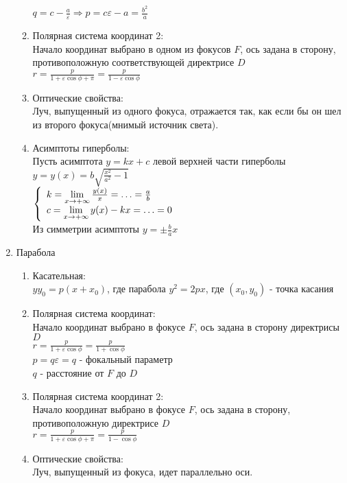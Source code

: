 \documentclass[12pt]{article}
\begin{document}
\begin{enumerate}
\begin{enumerate}
        $q = c - \frac a\varepsilon \Rightarrow p=c\varepsilon - a = \frac{b^2}a$
        \item Полярная система координат 2:\\
        Начало координат выбрано в одном из фокусов $F$, ось задана в сторону, противоположную соответствующей директрисе $D$\\
        $r=\frac{p}{1+\varepsilon\cos\phi+\pi} = \frac{p}{1-\varepsilon\cos\phi}$
        \item Оптические свойства:\\
        Луч, выпущенный из одного фокуса, отражается так, как если бы он шел из второго фокуса(мнимый источник света).
        \item Асимптоты гиперболы:\\
        Пусть асимптота $y=kx+c$ левой верхней части гиперболы $y=y(x)=b\sqrt{\frac{x^2}{a^2}-1}$ \\
        $\left\{\begin{array}{l}
             k = \lim\limits_{x\rightarrow +\infty} \frac{y(x)}x = \ldots = \frac ab \\
             c = \lim\limits_{x\rightarrow +\infty} y(x)-kx = \ldots = 0
        \end{array}\right.$\\
        Из симметрии асимптоты $y=\pm\frac bax$
    \end{enumerate}
    \item Парабола
    \begin{enumerate}
        \item Касательная:\\
        $yy_0=p(x+x_0)$, где парабола  $y^2=2px$, где $(x_0, y_0)$ - точка касания
        \item Полярная система координат:\\
        Начало координат выбрано в фокусе $F$, ось задана в сторону директрисы $D$\\
        $r=\frac{p}{1+\varepsilon\cos\phi} = \frac{p}{1+\cos\phi}$\\
        $p = q\varepsilon = q$ - фокальный параметр\\
        $q$ - расстояние от $F$ до $D$
        \item Полярная система координат 2:\\
        Начало координат выбрано в фокусе $F$, ось задана в сторону, противоположную директрисе $D$\\
        $r=\frac{p}{1+\varepsilon\cos\phi+\pi} = \frac{p}{1-\cos\phi}$
        \item Оптические свойства:\\
        Луч, выпущенный из фокуса, идет параллельно оси.
    \end{enumerate}
    \end{enumerate}
\end{document}

